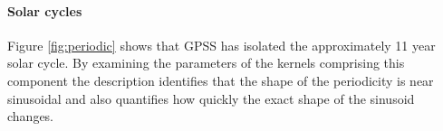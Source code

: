 \documentclass{article}
\begin{document}



\paragraph{Solar cycles}

Figure \ref{fig:periodic} shows that GPSS has isolated the approximately 11 year solar cycle.
By examining the parameters of the kernels comprising this component the description identifies that the shape of the periodicity is near sinusoidal  and also quantifies how quickly the exact shape of the sinusoid changes.

%

\end{document}
